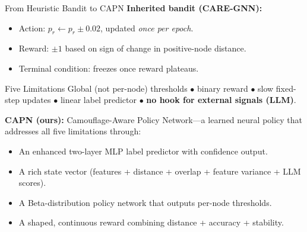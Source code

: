 \documentclass[aspectratio=169,10pt]{beamer}
\begin{document}
\begin{frame}{From Heuristic Bandit to CAPN}
    \textbf{Inherited bandit (CARE-GNN):}
    \begin{itemize}
        \item Action: $p_r \leftarrow p_r \pm 0.02$, updated \emph{once per epoch}.
        \item Reward: $\pm 1$ based on sign of change in positive-node distance.
        \item Terminal condition: freezes once reward plateaus.
    \end{itemize}
    \vspace{0.3em}
    \begin{alertblock}{Five Limitations}
        Global (not per-node) thresholds $\bullet$ binary reward
        $\bullet$ slow fixed-step updates $\bullet$ linear label predictor
        $\bullet$ \textbf{no hook for external signals (LLM)}.
    \end{alertblock}
    \vspace{0.3em}
    \textbf{CAPN (ours):} Camouflage-Aware Policy Network---a learned neural policy
    that addresses all five limitations through:
    \begin{itemize}
        \item An enhanced two-layer MLP label predictor with confidence output.
        \item A rich state vector (features + distance + overlap + feature variance + LLM scores).
        \item A Beta-distribution policy network that outputs per-node thresholds.
        \item A shaped, continuous reward combining distance + accuracy + stability.
    \end{itemize}
\end{frame}
\end{document}
